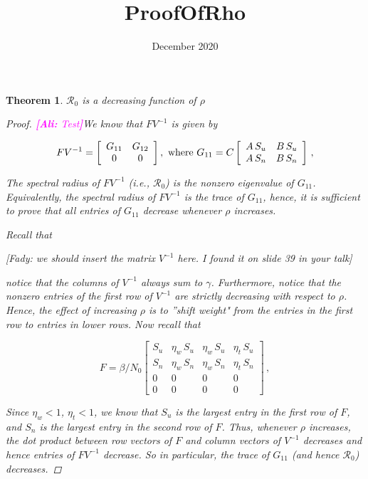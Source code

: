 \documentclass{article}
\title{ProofOfRho}
\date{December 2020}
\newtheorem{theorem}[]{Theorem}
\newcommand{\Rnum}{\mathcal{R}_0}
\newcommand{\comment}{\showcomment}
\newcommand{\showcomment}[3]{\textcolor{#1}{\textbf{[#2: }\textsl{#3}\textbf{]}}}
\newcommand{\ali}[1]{\comment{magenta}{Ali}{#1}}
\begin{document}
\begin{theorem}
$\Rnum$ is a decreasing function of $\rho$
\begin{proof}
\ali{Test}We know that $FV^{-1}$ is given by

\begin{equation}
FV^{-1} = \left[ \begin {array}{cc}
G_{11}&G_{12}\\ 
0&0
\end {array} \right], \text{ where } \\
G_{11} =C
\left[\begin {array}{cc}
A\,S_u & B\,S_u\\
A\,S_n & B\,S_n
\end {array}\right]\nonumber \, ,
\end{equation}

The spectral radius of $FV^{-1}$ (i.e., $\Rnum$) is the nonzero eigenvalue of $G_{11}$. Equivalently, the spectral radius of $FV^{-1}$ is the trace of $G_{11}$, hence, it is sufficient to prove that all entries of $G_{11}$ decrease whenever $\rho$ increases.

Recall that

[Fady: we should insert the matrix $V^{-1}$ here. I found it on slide 39 in your talk]

notice that the columns of $V^{-1}$ always sum to $\gamma$. Furthermore, notice that the nonzero entries of the first row of $V^{-1}$ are strictly decreasing with respect to $\rho$.  Hence, the effect of increasing $\rho$ is to ''shift weight" from the entries in the first row to entries in lower rows. Now recall that

\begin{equation}
F = \beta/N_0 \left[ \begin {array}{cccc} 
S_u&\eta_w\,S_u&\eta_w\,S_u&\eta_t\,S_u\\
S_n&\eta_w\,S_n&\eta_w\,S_n&\eta_t\,S_n\\ 
0&0&0&0\\
0&0&0&0
\end {array} \right]\,,
\end{equation}

Since $\eta_w < 1$, $\eta_t < 1$, we know that $S_u$ is the largest entry in the first row of $F$, and $S_n$ is the largest entry in the second row of $F$. Thus, whenever $\rho$ increases, the dot product between row vectors of $F$ and column vectors of $V^{-1}$ decreases and hence entries of $FV^{-1}$ decrease. So in particular, the trace of $G_{11}$ (and hence $\Rnum$) decreases.

\end{proof}
\end{theorem}
\end{document}
